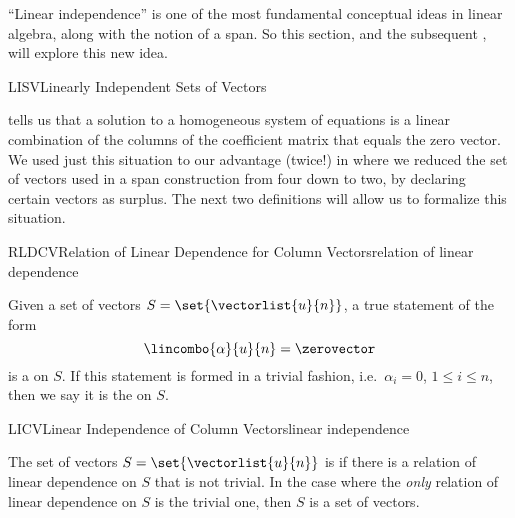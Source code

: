 %
\begin{introduction}
\begin{para}``Linear independence'' is one of the most fundamental conceptual ideas in linear algebra, along with the notion of a span.  So this section, and the subsequent , will explore this new idea.\end{para}
\end{introduction}
%
\begin{subsect}{LISV}{Linearly Independent Sets of Vectors}
%
\begin{para} tells us that a solution to a homogeneous system of equations is a linear combination of the columns of the coefficient matrix that equals the zero vector.  We used just this situation to our advantage (twice!) in  where we reduced the set of vectors used in a span construction from four down to two, by declaring certain vectors as surplus.  The next two definitions will allow us to formalize this situation.\end{para}
%
%
\begin{definition}{RLDCV}{Relation of Linear Dependence for Column Vectors}{relation  of linear dependence}
\begin{para}Given a set of vectors $S=\set{\vectorlist{u}{n}}$, a true statement of the form
%
\begin{equation*}
\lincombo{\alpha}{u}{n}=\zerovector
\end{equation*}
%
is a  on $S$.  If this statement is formed in a trivial fashion, i.e.\ $\alpha_i=0$, $1\leq i\leq n$, then we say it is the  on $S$.\end{para}
%
\end{definition}
%
%
\begin{definition}{LICV}{Linear Independence of Column Vectors}{linear independence}
\begin{para}The set of vectors $S=\set{\vectorlist{u}{n}}$ is  if there is a relation of linear dependence on $S$ that is not trivial.  In the case where the {\em only} relation of linear dependence on $S$ is the trivial one, then $S$ is a  set of vectors.\end{para}

\end{definition}
\end{subsect}
